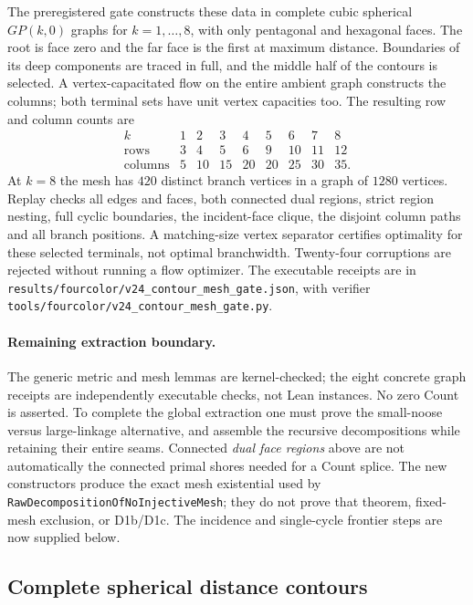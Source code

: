 The preregistered gate constructs these data in complete cubic spherical
$GP(k,0)$ graphs for $k=1,\ldots,8$, with only pentagonal and hexagonal
faces.  The root is face zero and the far face is the first at maximum
distance.  Boundaries of its deep components are traced in full, and the
middle half of the contours is selected.  A vertex-capacitated flow on
the entire ambient graph constructs the columns; both terminal sets have
unit vertex capacities too.  The resulting row and column counts are
\[
\begin{array}{c|rrrrrrrr}
k&1&2&3&4&5&6&7&8\\ \hline
\text{rows}&3&4&5&6&9&10&11&12\\
\text{columns}&5&10&15&20&20&25&30&35.
\end{array}
\]
At $k=8$ the mesh has $420$ distinct branch vertices in a graph of $1280$
vertices.  Replay checks all edges and faces, both connected dual regions,
strict region nesting, full cyclic boundaries, the incident-face clique,
the disjoint column paths and all branch positions.  A matching-size
vertex separator certifies optimality for these selected terminals, not
optimal branchwidth.  Twenty-four corruptions are rejected without running
a flow optimizer.  The executable receipts are in
\texttt{results/fourcolor/v24\_contour\_mesh\_gate.json}, with verifier
\texttt{tools/fourcolor/v24\_contour\_mesh\_gate.py}.

\paragraph{Remaining extraction boundary.}
The generic metric and mesh lemmas are kernel-checked; the eight concrete
graph receipts are independently executable checks, not Lean instances.
No zero Count is asserted.  To complete the global extraction one must
prove the small-noose versus large-linkage alternative, and assemble the recursive decompositions while
retaining their entire seams.  Connected \emph{dual face regions} above
are not automatically the connected primal shores needed for a Count
splice.  The new constructors produce the exact mesh existential used by
\texttt{RawDecompositionOfNoInjectiveMesh}; they do not prove that theorem,
fixed-mesh exclusion, or D1b/D1c.  The incidence and single-cycle frontier steps are now supplied below.

\subsection{Complete spherical distance contours}
\label{sec:complete-spherical-distance-contours}

